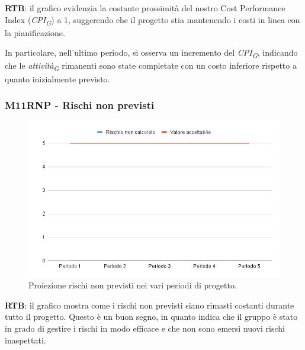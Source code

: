 \textbf{RTB}: il grafico evidenzia la costante prossimità del nostro Cost Performance Index (\textit{CPI}\textsubscript{\textit{G}}) a 1, suggerendo che il progetto stia mantenendo i costi in linea con la pianificazione.

\vspace{0.2cm}

In particolare, nell'ultimo periodo, si osserva un incremento del \textit{CPI}\textsubscript{\textit{G}}, indicando che le \textit{attività}\textsubscript{\textit{G}} rimanenti sono state completate con un costo inferiore rispetto a quanto inizialmente previsto.

\subsubsection{M11RNP - Rischi non previsti}

\vspace{0.3cm}

\begin{figure}[H]
    \centering
    \includegraphics[width=1\textwidth]{../Images/PianoDiQualifica/M11RNP.png}
    \caption{Proiezione rischi non previsti nei vari periodi di progetto.}
    \label{fig:7}
\end{figure}

\vspace{0.2cm}

\textbf{RTB}: il grafico mostra come i rischi non previsti siano rimasti costanti durante tutto il progetto. Questo è un buon segno, in quanto indica che il gruppo è stato in grado di gestire i rischi in modo efficace e che non sono emersi nuovi rischi inaspettati.
